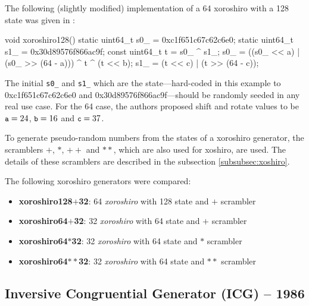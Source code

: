     The following (slightly modified) implementation of a \SI{64}{\bit} xoroshiro with a \SI{128}{\bit} state was given in \cite{Blackman:2018}:
\begin{@empty}
    \lstset{
        language = [ISO]C++
    }
\begin{centeredshadowboxlisting}
void xoroshiro128() {
    static uint64_t s0_ = 0xc1f651c67c62c6e0;
    static uint64_t s1_ = 0x30d89576f866ac9f;
    const uint64_t t = s0_ ^ s1_;
    s0_ = ((s0_ << a) | (s0_ >> (64 - a)))
        ^ t ^ (t << b);
    s1_ = (t << c) | (t >> (64 - c));
}
\end{centeredshadowboxlisting}
\end{@empty}
    \textcolor{black!75}{The initial \lstinline|s0_| and \lstinline|s1_| which are the state---hard-coded in this example to 0xc1f651c67c62c6e0 and 0x30d89576f866ac9f---should be randomly seeded in any real use case.} For the \SI{64}{\bit} case, the authors proposed shift and rotate values to be $\texttt{\small a} = 24$, $\texttt{\small b} = 16$ and $\texttt{\small c} = 37$.

        To generate pseudo-random numbers from the states of a xoroshiro generator, the scramblers $\mathbf{+}$, $\mathbf{*}$, $\mathbf{++}$ and $\mathbf{**}$, which are also used for xoshiro, are used. The details of these scramblers are described in the subsection \ref{subsubsec:xoshiro}.

    The following xoroshiro generators were compared:
    \begin{itemize}
        \itemsep0em
        \item \textbf{xoroshiro128$\mathbf{+}$32}: \SI{64}{\bit} \emph{xoroshiro} with \SI{128}{\bit} state and $\mathbf{+}$ scrambler
        \item \textbf{xoroshiro64$\mathbf{+}$32}:  \SI{32}{\bit} \emph{xoroshiro} with \SI{64}{\bit} state and $\mathbf{+}$ scrambler
        \item \textbf{xoroshiro64$\mathbf{*}$32}:  \SI{32}{\bit} \emph{xoroshiro} with \SI{64}{\bit} state and $\mathbf{*}$ scrambler
        \item \textbf{xoroshiro64$\mathbf{**}$32}: \SI{32}{\bit} \emph{xoroshiro} with \SI{64}{\bit} state and $\mathbf{**}$ scrambler
    \end{itemize}

\subsection[Inversive Congruential Generator (ICG) -- 1986]{Inversive Congruential Generator (ICG) -- 1986} \label{subsec:icg}

